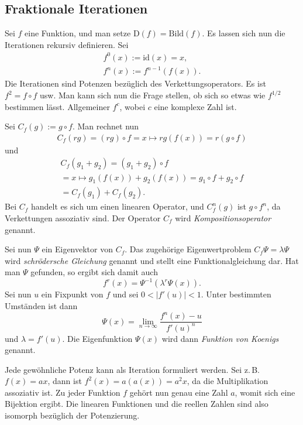 \documentclass[a4paper,11pt,fleqn,twocolumn,twoside]{scrartcl}
\numberwithin{equation}{section}
\begin{document}
\subsection{Fraktionale Iterationen}

Sei $f$ eine Funktion, und man setze
$\mathrm{D}(f)=\mathrm{Bild}(f)$. Es lassen sich nun die
Iterationen rekursiv definieren. Sei
\begin{gather*}
f^0(x) := \mathrm{id}(x) = x,\\
f^n(x) := f^{n-1}(f(x)).
\end{gather*}
Die Iterationen sind Potenzen bezüglich des Verkettungsoperators.
Es ist $f^2=f\circ f$ usw. Man kann sich nun die Frage stellen,
ob sich so etwas wie $f^{1/2}$ bestimmen lässt. Allgemeiner $f^c$,
wobei $c$ eine komplexe Zahl ist.

Sei $C_f(g) := g\circ f$. Man rechnet nun
\begin{gather*}
C_f(rg) = (rg)\circ f = x\mapsto rg(f(x)) = r(g\circ f)
\end{gather*}
und
\begin{gather*}
C_f(g_1+g_2) = (g_1+g_2)\circ f\\
= x\mapsto g_1(f(x))+g_2(f(x))
= g_1\circ f+g_2\circ f
\\= C_f(g_1)+C_f(g_2).
\end{gather*}
Bei $C_f$ handelt es sich um einen linearen Operator, und
$C_f^n(g)$ ist $g\circ f^n$, da Verkettungen assoziativ sind.
Der Operator $C_f$ wird \textit{Kompositionsoperator} genannt.

Sei nun $\Psi$ ein Eigenvektor von $C_f$. Das zugehörige
Eigenwertproblem $C_f\Psi = \lambda\Psi$ wird
\textit{schrödersche Gleichung}
genannt und stellt eine Funktionalgleichung dar. Hat man $\Psi$
gefunden, so ergibt sich damit auch
\begin{equation}
f^r(x) = \Psi^{-1}(\lambda^r\Psi(x)).
\end{equation}
Sei nun $u$ ein Fixpunkt von $f$ und sei $0<|f'(u)|<1$.
Unter bestimmten Umständen ist dann
\begin{equation}
\Psi(x) = \lim_{n\rightarrow\infty}\frac{f^n(x)-u}{f'(u)^n}
\end{equation}
und $\lambda=f'(u)$. Die Eigenfunktion $\Psi(x)$ wird
dann \textit{Funktion von Koenigs} genannt.

Jede gewöhnliche Potenz kann als Iteration formuliert werden.
Sei z.\,B. $f(x)=ax$, dann ist $f^2(x)=a(a(x))=a^2 x$, da die
Multiplikation assoziativ ist. Zu jeder Funktion $f$ gehört nun
genau eine Zahl $a$, womit sich eine Bijektion ergibt. Die
linearen Funktionen und die reellen Zahlen sind also isomorph
bezüglich der {\glqq}Potenzierung{\grqq}.
\end{document}
